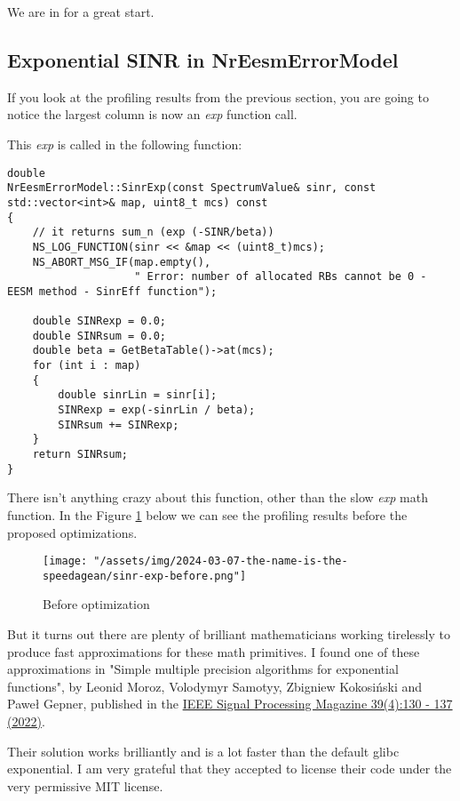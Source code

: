 \documentclass{article}
\begin{document}
We are in for a great start.

\subsection{Exponential SINR in NrEesmErrorModel}

If you look at the profiling results from the previous section, you are
going to notice the largest column is now an \emph{exp} function call.

This \emph{exp} is called in the following function:

\begin{lstlisting}
double
NrEesmErrorModel::SinrExp(const SpectrumValue& sinr, const std::vector<int>& map, uint8_t mcs) const
{
    // it returns sum_n (exp (-SINR/beta))
    NS_LOG_FUNCTION(sinr << &map << (uint8_t)mcs);
    NS_ABORT_MSG_IF(map.empty(),
                    " Error: number of allocated RBs cannot be 0 - EESM method - SinrEff function");

    double SINRexp = 0.0;
    double SINRsum = 0.0;
    double beta = GetBetaTable()->at(mcs);
    for (int i : map)
    {
        double sinrLin = sinr[i];
        SINRexp = exp(-sinrLin / beta);
        SINRsum += SINRexp;
    }
    return SINRsum;
}
\end{lstlisting}

There isn't anything crazy about this function, other than the slow \emph{exp}
math function. In the Figure \ref{fig:sinr-exp-before} below we can see the
profiling results before the proposed optimizations.

\begin{figure}
    \texttt{[image: "/assets/img/2024-03-07-the-name-is-the-speedagean/sinr-exp-before.png"]}
    \caption{Before optimization}
    \label{fig:sinr-exp-before}
\end{figure}

But it turns out there are plenty of brilliant mathematicians working tirelessly
to produce fast approximations for these math primitives. I found one of these
approximations in "Simple multiple precision algorithms for exponential functions",
by Leonid Moroz, Volodymyr Samotyy, Zbigniew Kokosiński and Paweł Gepner, published in
the \href{https://ieeexplore.ieee.org/document/9810030}{IEEE Signal Processing Magazine 39(4):130 - 137 (2022)}.

Their solution works brilliantly and is a lot faster than the default glibc exponential.
I am very grateful that they accepted to license their code under the very permissive MIT license.
\end{document}
